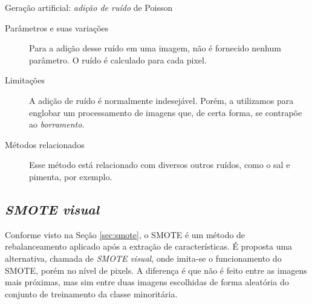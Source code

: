 \begin{algorithm}[!htbp]
  \caption{Geração artificial: \emph{adição de ruído} de Poisson}
  \label{alg:noise}
  \SetAlgoLined

\end{algorithm}

\begin{description}
  \item[Parâmetros e suas variações] Para a adição desse ruído em uma imagem, não é fornecido nenhum parâmetro. O ruído é calculado para cada pixel.
  \item[Limitações] A adição de ruído é normalmente indesejável. Porém, a utilizamos para englobar um processamento de imagens que, de certa forma, se contrapõe ao \emph{borramento}.
  \item[Métodos relacionados] Esse método está relacionado com diversos outros ruídos, como o sal e pimenta, por exemplo.
\end{description}
\FloatBarrier
\subsection{\emph{SMOTE visual}}

Conforme visto na Seção \ref{sec:smote}, o SMOTE é um método de rebalanceamento aplicado após a extração de características. É proposta uma alternativa, chamada de \emph{SMOTE visual}, onde imita-se o funcionamento do SMOTE, porém no nível de pixels. A diferença é que não é feito entre as imagens mais próximas, mas sim entre duas imagens escolhidas de forma aleatória do conjunto de treinamento da classe minoritária.

